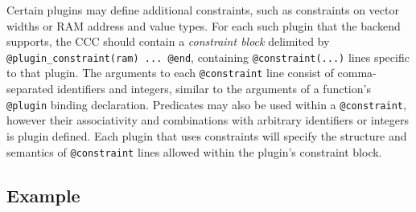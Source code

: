Certain plugins may define additional constraints, such as constraints on
vector widths or RAM address and value types.
For each such plugin that the backend supports, the CCC should contain a
\emph{constraint block} delimited by \texttt{@plugin\_constraint(ram) ... @end}, containing
\texttt{@constraint(...)} lines specific to that plugin.
The arguments to each \texttt{@constraint} line consist of comma-separated identifiers and
integers, similar to the arguments of a function's \texttt{@plugin} binding
declaration.
Predicates may also be used within a \texttt{@constraint}, however their associativity and combinations with arbitrary identifiers or integers is plugin defined.
Each plugin that uses constraints will specify the structure and semantics of
\texttt{@constraint} lines allowed within the plugin's constraint block.

\subsection{Example}\label{sec:ccc_example}

